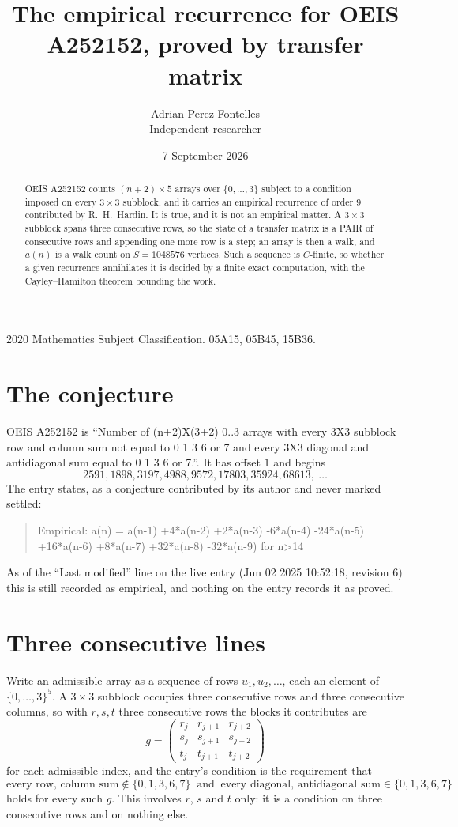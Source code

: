 \documentclass[11pt,a4paper]{article}
\title{The empirical recurrence for OEIS A252152, proved by transfer matrix}
\author{Adrian Perez Fontelles\\ \small Independent researcher}
\date{7 September 2026}
\theoremstyle{plain}
\theoremstyle{definition}
\begin{document}
\maketitle

\begin{abstract}
OEIS A252152 counts $(n+2)\times5$ arrays over $\{0,\dots,3\}$ subject to a condition imposed on
every $3\times3$ subblock, and it carries an empirical recurrence of order $9$
contributed by R.~H.~Hardin. It is true, and it is not an empirical matter. A $3\times3$
subblock spans three consecutive rows, so the state of a transfer matrix is a PAIR of
consecutive rows and appending one more row is a step; an array is then a walk, and
$a(n)$ is a walk count on $S=1048576$ vertices. Such a sequence is $C$-finite, so whether a given
recurrence annihilates it is decided by a finite exact computation, with the Cayley--Hamilton
theorem bounding the work.
\end{abstract}

\noindent\small 2020 Mathematics Subject Classification. 05A15, 05B45, 15B36.\normalsize

\section{The conjecture}

OEIS A252152 is ``Number of (n+2)X(3+2) 0..3 arrays with every 3X3 subblock row and column sum not equal to 0 1 3 6 or 7 and every 3X3 diagonal and antidiagonal sum equal to 0 1 3 6 or 7.''. It has offset $1$ and begins
\[
2591, 1898, 3197, 4988, 9572, 17803, 35924, 68613,\ \dots
\]
The entry states, as a conjecture contributed by its author and never marked settled:
\begin{quote}
Empirical: a(n) = a(n-1) +4*a(n-2) +2*a(n-3) -6*a(n-4) -24*a(n-5) +16*a(n-6) +8*a(n-7) +32*a(n-8) -32*a(n-9) for n>14
\end{quote}
As of the ``Last modified'' line on the live entry (Jun 02 2025 10:52:18, revision 6) this is still
recorded as empirical, and nothing on the entry records it as proved.

\section{Three consecutive lines}

Write an admissible array as a sequence of rows $u_1,u_2,\dots$, each an element of
$\{0,\dots,3\}^{5}$. A $3\times3$ subblock occupies three consecutive rows and
three consecutive columns, so with $r,s,t$ three consecutive rows the blocks it
contributes are
\[
g=\begin{pmatrix}r_j&r_{j+1}&r_{j+2}\\ s_j&s_{j+1}&s_{j+2}\\ t_j&t_{j+1}&t_{j+2}\end{pmatrix}
\]
for each admissible index, and the entry's condition is the requirement that
\[
\text{every row, column sum} \notin \{0,1,3,6,7\}\ \text{ and }\ \text{every diagonal, antidiagonal sum} \in \{0,1,3,6,7\}
\]
holds for every such $g$. This involves $r$, $s$ and $t$ only: it is a condition on
three consecutive rows and on nothing else.
\end{document}

